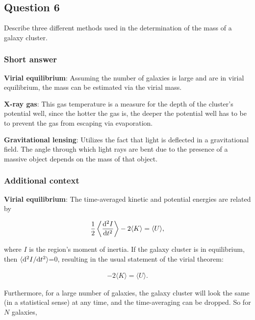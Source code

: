 \documentclass[a4paper,10pt]{article}
\begin{document}
\newpage
\subsection{Question 6}

Describe three different methods used in the determination of the mass of a galaxy cluster.

\subsubsection{Short answer}

{\noindent}\textbf{Virial equilibrium}: Assuming the number of galaxies is large and are in virial equilibrium, the mass can be estimated via the virial mass.

{\noindent}\textbf{X-ray gas}: This gas temperature is a measure for the depth of the cluster's potential well, since the hotter the gas is, the deeper the potential well has to be to prevent the gas from escaping via evaporation.

{\noindent}\textbf{Gravitational lensing}: Utilizes the fact that light is deflected in a gravitational field. The angle through which light rays are bent due to the presence of a massive object depends on the mass of that object.

\subsubsection{Additional context}

{\noindent}\textbf{Virial equilibrium}: The time-averaged kinetic and potential energies are related by

\begin{align*}
    \frac{1}{2} \left\langle\frac{{\rm d^2}I}{{\rm d}t^2}\right\rangle - 2\langle K\rangle = \langle U\rangle,
\end{align*}

{\noindent}where $I$ is the region's moment of inertia. If the galaxy cluster is in equilibrium, then $\langle{\rm d}^2I/{\rm d}t^2\rangle$=0, resulting in the usual statement of the virial theorem:

\begin{align*}
    -2\langle K\rangle = \langle U\rangle.
\end{align*}

{\noindent}Furthermore, for a large number of galaxies, the galaxy cluster will look the same (in a statistical sense) at any time, and the time-averaging can be dropped. So for $N$ galaxies, 
\end{document}
